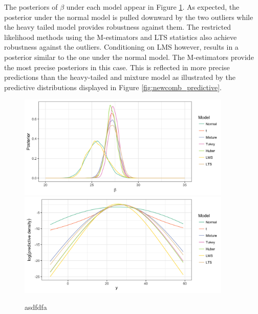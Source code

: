 \documentclass[ba]{imsart}
\begin{document}
The posteriors of $\beta$ under each model appear in Figure \ref{fig:newcomb_post}. As expected, the posterior under the normal model is pulled downward by the two outliers while the heavy tailed model provides robustness against them. The restricted likelihood methods using the M-estimators and LTS statistics also achieve robustness against the outliers. Conditioning on LMS however, results in a posterior similar to the one under the normal model. The M-estimators provide the most precise posteriors in this case. This is reflected in more precise predictions than the heavy-tailed and mixture model as illustrated by the predictive distributions displayed in  Figure \ref{fig:newcomb_predictive}.
\begin{figure}[t]
\centering
{\includegraphics[width = 4in]{figs/speed_of_light_beta.png}}
{\includegraphics[width = 4in]{figs/speed_of_light_predictive.png}}
\caption{asdfdfa}
\label{fig:newcomb_post}
\end{figure}

\end{document}
